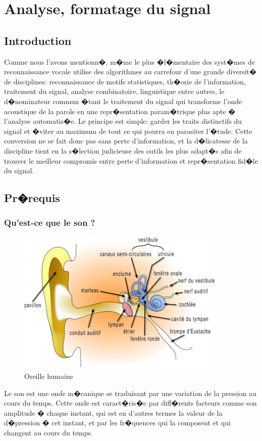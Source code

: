 \chapter{Analyse, formatage du signal}
    		\section{Introduction}
    		Comme nous l'avons mentionn�, m�me le plus �l�mentaire des syst�mes de reconnaissance vocale utilise des algorithmes au carrefour d'une grande diversit� de disciplines: 
    		reconnaissance de motifs statistiques, th�orie de l'information, traitement du signal, analyse combinatoire, linguistique entre autres, 
    		le d�nominateur commun �tant le traitement du signal qui transforme l'onde acoustique de la parole en une repr�sentation param�trique plus apte � l'analyse automatis�e. Le principe est simple: garder les traits distinctifs du signal et �viter au maximum de tout ce qui pourra en parasiter l'�tude. Cette conversion ne se fait donc pas sans perte d'information, et la d�licatesse de la discipline tient en la s�lection judicieuse des outils les plus adapt�s afin de trouver le meilleur compromis entre perte d'information et repr�sentation fid�le du signal.
    		\section{Pr�requis}
    		\subsection{Qu'est-ce que le son ?}
\begin{figure}[H]
	    \begin{center}
		    \includegraphics[width=10cm]{Images/oreille.png} 
	    \end{center}
	    \caption{Oreille humaine}
\end{figure}
	Le son est une onde m�canique se traduisant par une variation de la pression au cours du temps. Cette onde est caract�ris�e par diff�rents facteurs comme son amplitude � chaque instant, qui est en d'autres termes la valeur de la d�pression � cet instant, et par les fr�quences qui la composent et qui changent au cours du temps.
